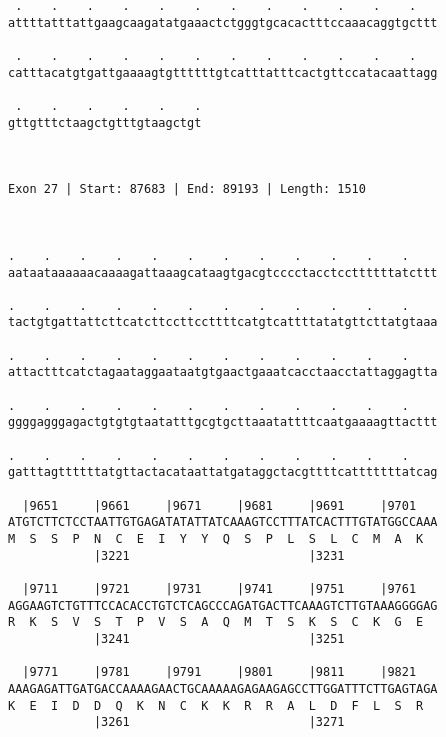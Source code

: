 \documentclass{article}
\begin{document}
\begin{Verbatim}
 .    .    .    .    .    .    .    .    .    .    .    .   
attttatttattgaagcaagatatgaaactctgggtgcacactttccaaacaggtgcttt
                                                            
 .    .    .    .    .    .    .    .    .    .    .    .   
catttacatgtgattgaaaagtgttttttgtcatttatttcactgttccatacaattagg
                                                            
 .    .    .    .    .    .
gttgtttctaagctgtttgtaagctgt
                           
                           
 
Exon 27 | Start: 87683 | End: 89193 | Length: 1510



.    .    .    .    .    .    .    .    .    .    .    .    
aataataaaaaacaaaagattaaagcataagtgacgtcccctacctccttttttatcttt
                                                            
.    .    .    .    .    .    .    .    .    .    .    .    
tactgtgattattcttcatcttccttccttttcatgtcattttatatgttcttatgtaaa
                                                            
.    .    .    .    .    .    .    .    .    .    .    .    
attactttcatctagaataggaataatgtgaactgaaatcacctaacctattaggagtta
                                                            
.    .    .    .    .    .    .    .    .    .    .    .    
ggggagggagactgtgtgtaatatttgcgtgcttaaatattttcaatgaaaagttacttt
                                                            
.    .    .    .    .    .    .    .    .    .    .    .    
gatttagttttttatgttactacataattatgataggctacgttttcatttttttatcag
                                                            
  |9651     |9661     |9671     |9681     |9691     |9701   
ATGTCTTCTCCTAATTGTGAGATATATTATCAAAGTCCTTTATCACTTTGTATGGCCAAA
M  S  S  P  N  C  E  I  Y  Y  Q  S  P  L  S  L  C  M  A  K  
            |3221                         |3231             
  
  |9711     |9721     |9731     |9741     |9751     |9761   
AGGAAGTCTGTTTCCACACCTGTCTCAGCCCAGATGACTTCAAAGTCTTGTAAAGGGGAG
R  K  S  V  S  T  P  V  S  A  Q  M  T  S  K  S  C  K  G  E  
            |3241                         |3251             
  
  |9771     |9781     |9791     |9801     |9811     |9821   
AAAGAGATTGATGACCAAAAGAACTGCAAAAAGAGAAGAGCCTTGGATTTCTTGAGTAGA
K  E  I  D  D  Q  K  N  C  K  K  R  R  A  L  D  F  L  S  R  
            |3261                         |3271             
  

\end{Verbatim}
\end{document}
